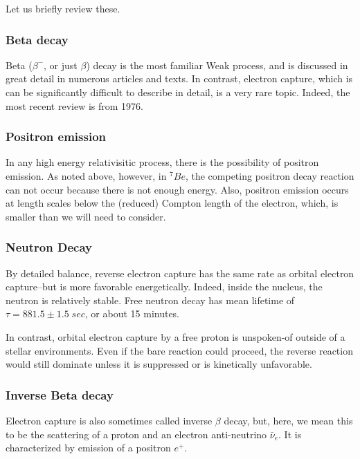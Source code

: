 \documentclass[%
 aip,
 jmp,%
 amsmath,amssymb,
 reprint,%
]{revtex4-1}
\begin{document}
Let us briefly review these.

\subsubsection{Beta decay} 

Beta ($\beta^{-}$, or just $\beta$) decay is the most familiar Weak process, and is discussed in great detail in numerous articles and texts. In contrast, electron capture, which is can be significantly difficult to describe in detail, is a very rare topic.  Indeed, the most recent review is from 1976.\cite{ec-review1}

\subsubsection{Positron emission} 

In any high energy relativisitic process, there is the possibility of positron emission.  As noted above, however, in $^{7}Be$, the competing positron decay reaction can not occur because there is not enough energy.  Also, positron emission occurs at length scales below the (reduced) Compton length of the electron, which, is smaller than we will need to consider.

\subsubsection{Neutron Decay} 

By detailed balance,  reverse electron capture has the same rate as orbital electron capture--but is more favorable energetically.  Indeed, inside the nucleus, the neutron is relatively stable. Free neutron decay has mean lifetime of $\tau=881.5\pm1.5\;sec $, or about 15 minutes. 

In contrast, orbital electron capture by a free proton is unspoken-of outside of a stellar environments. Even if the bare reaction could proceed, the reverse reaction would still dominate unless it is suppressed or is kinetically unfavorable.  

\subsubsection{Inverse Beta decay} 

Electron capture is also sometimes called inverse $\beta$ decay, but, here, we mean this to be the scattering of a proton and an electron anti-neutrino $\bar{\nu}_{e}$.  It is characterized by emission of a positron $e^{+}$. 
\end{document}
